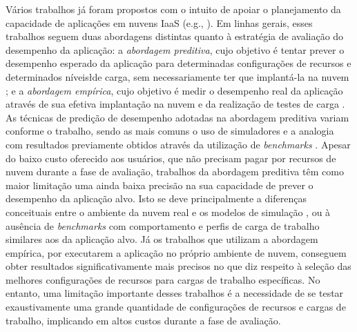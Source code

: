 \documentclass[12pt]{article}
\begin{document}
Vários trabalhos já foram propostos com o intuito de apoiar o planejamento da capacidade de aplicações em nuvens IaaS (e.g., \cite{cloudharmony, malkowski2010cloudxplor, fittkau2012cdosim, li2011cloudprophet, jayasinghe2012, silva2013cloudbench, cunha2013b, jung2013cloudadvisor, scheuner2014cloud}). Em linhas gerais, esses trabalhos seguem duas abordagens distintas quanto à estratégia de avaliação do desempenho da aplicação: a \emph{abordagem preditiva}, cujo objetivo é tentar prever o desempenho esperado da aplicação para determinadas configurações de recursos e determinados níveis\l de carga, sem necessariamente ter que implantá-la na nuvem  \cite{cloudharmony, malkowski2010cloudxplor, fittkau2012cdosim, li2011cloudprophet, jung2013cloudadvisor}; e a \emph{abordagem empírica}, cujo objetivo é medir o desempenho real da aplicação através de sua efetiva implantação na nuvem e da realização de testes de carga \cite{jayasinghe2012, silva2013cloudbench, cunha2013b, scheuner2014cloud}. As técnicas de predição de desempenho adotadas na abordagem preditiva variam conforme o trabalho, sendo as mais comuns o uso de simuladores \cite{fittkau2012cdosim} e a analogia com resultados previamente obtidos através da utilização de \emph{benchmarks} \cite{cloudharmony, malkowski2010cloudxplor}. Apesar do baixo custo oferecido aos usuários, que não precisam pagar por recursos de nuvem durante a fase de avaliação, trabalhos da abordagem preditiva têm como maior limitação uma ainda baixa precisão na sua  capacidade de prever o desempenho da aplicação alvo. Isto se deve principalmente a diferenças conceituais entre o ambiente da nuvem real e os modelos de simulação \cite{fittkau2012cdosim}, ou à ausência de \emph{benchmarks} com comportamento e perfis de carga de trabalho similares aos da aplicação alvo. Já os trabalhos que utilizam a abordagem empírica, por executarem a aplicação no próprio ambiente de nuvem, conseguem obter resultados significativamente mais precisos no que diz respeito à seleção das melhores configurações de recursos para cargas de trabalho específicas. No entanto, uma limitação importante desses trabalhos é a necessidade de se testar exaustivamente uma grande quantidade de configurações de recursos e cargas de trabalho, implicando em altos custos durante a fase de avaliação.
\end{document}
